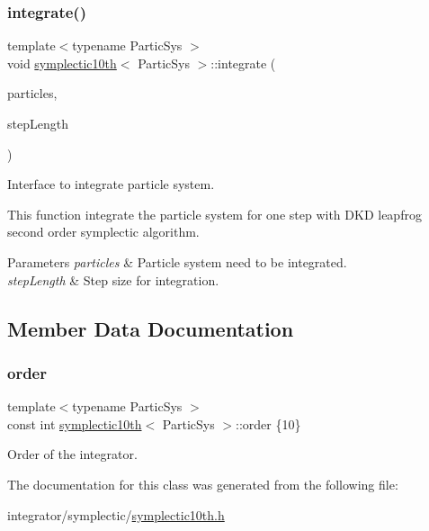 \subsubsection{\texorpdfstring{integrate()}{integrate()}}
{\footnotesize\ttfamily template$<$typename Partic\+Sys $>$ \\
void \mbox{\hyperlink{classsymplectic10th}{symplectic10th}}$<$ Partic\+Sys $>$\+::integrate (\begin{DoxyParamCaption}\item[{Partic\+Sys \&}]{particles,  }\item[{\mbox{\hyperlink{classsymplectic10th_a700bbf7a6116e27ac7c6bfd0cc3018bc}{Scalar}}}]{step\+Length }\end{DoxyParamCaption})}



Interface to integrate particle system. 

This function integrate the particle system for one step with D\+KD leapfrog second order symplectic algorithm. 
\begin{DoxyParams}{Parameters}
{\em particles} & Particle system need to be integrated. \\
\hline
{\em step\+Length} & Step size for integration. \\
\hline
\end{DoxyParams}


\subsection{Member Data Documentation}
\mbox{\label{classsymplectic10th_af1cb88e94e3022b5bf90091d03c609a4}} 
\subsubsection{\texorpdfstring{order}{order}}
{\footnotesize\ttfamily template$<$typename Partic\+Sys $>$ \\
const int \mbox{\hyperlink{classsymplectic10th}{symplectic10th}}$<$ Partic\+Sys $>$\+::order \{10\}\hspace{0.3cm}{\ttfamily [static]}}



Order of the integrator. 



The documentation for this class was generated from the following file\+:\begin{DoxyCompactItemize}
\item 
integrator/symplectic/\mbox{\hyperlink{symplectic10th_8h}{symplectic10th.\+h}}\end{DoxyCompactItemize}
